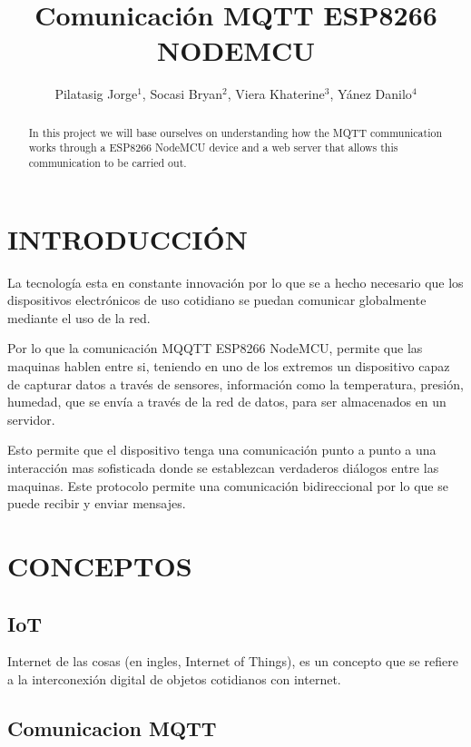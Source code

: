 \documentclass[letterpaper, 10 pt, conference]{ieeeconf}
\title{\LARGE \bf
Comunicación MQTT ESP8266 NODEMCU
}
\author{Pilatasig Jorge$^{1}$, Socasi Bryan$^{2}$, Viera Khaterine$^{3}$, Yánez Danilo$^{4}$%
}
\begin{document}
\maketitle
\thispagestyle{empty}
\pagestyle{empty}
\begin{abstract}

In this project we will base ourselves on understanding how the MQTT communication works through a ESP8266 NodeMCU device and a web server that allows this communication to be carried out.

\end{abstract}


\section{INTRODUCCIÓN}

La tecnología esta en constante innovación por lo que se a hecho necesario que los dispositivos electrónicos de uso cotidiano se puedan comunicar globalmente mediante el uso de la red.

Por lo que la comunicación MQQTT ESP8266 NodeMCU, permite que las maquinas hablen entre si, teniendo en uno de los extremos un dispositivo capaz de capturar datos a través de sensores, información como la temperatura, presión, humedad, que se envía a través de la red de datos, para ser almacenados en un servidor.

Esto permite que el dispositivo tenga una comunicación punto a punto a una interacción mas sofisticada donde se establezcan verdaderos diálogos entre las maquinas. Este protocolo permite una comunicación bidireccional por lo que se puede recibir y enviar mensajes.

\section{CONCEPTOS}

\subsection{IoT}

Internet de las cosas (en ingles, Internet of Things), es un concepto que se refiere a la interconexión digital de objetos cotidianos con internet.

\subsection{Comunicacion MQTT}
\end{document}
